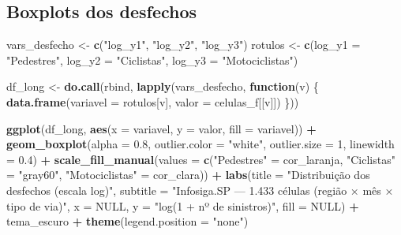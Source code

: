 \documentclass[
  11pt,
]{article}
\newenvironment{Shaded}{\begin{snugshade}}{\end{snugshade}}
\newcommand{\AttributeTok}[1]{\textcolor[rgb]{0.13,0.29,0.53}{#1}}
\newcommand{\ConstantTok}[1]{\textcolor[rgb]{0.56,0.35,0.01}{#1}}
\newcommand{\ControlFlowTok}[1]{\textcolor[rgb]{0.13,0.29,0.53}{\textbf{#1}}}
\newcommand{\DecValTok}[1]{\textcolor[rgb]{0.00,0.00,0.81}{#1}}
\newcommand{\FloatTok}[1]{\textcolor[rgb]{0.00,0.00,0.81}{#1}}
\newcommand{\FunctionTok}[1]{\textcolor[rgb]{0.13,0.29,0.53}{\textbf{#1}}}
\newcommand{\NormalTok}[1]{#1}
\newcommand{\OtherTok}[1]{\textcolor[rgb]{0.56,0.35,0.01}{#1}}
\newcommand{\SpecialCharTok}[1]{\textcolor[rgb]{0.81,0.36,0.00}{\textbf{#1}}}
\newcommand{\StringTok}[1]{\textcolor[rgb]{0.31,0.60,0.02}{#1}}
\begin{document}
\subsection{Boxplots dos desfechos}\label{boxplots-dos-desfechos}

\begin{Shaded}
\begin{Highlighting}[]
\NormalTok{vars\_desfecho }\OtherTok{\textless{}{-}} \FunctionTok{c}\NormalTok{(}\StringTok{"log\_y1"}\NormalTok{, }\StringTok{"log\_y2"}\NormalTok{, }\StringTok{"log\_y3"}\NormalTok{)}
\NormalTok{rotulos }\OtherTok{\textless{}{-}} \FunctionTok{c}\NormalTok{(}\AttributeTok{log\_y1 =} \StringTok{"Pedestres"}\NormalTok{, }\AttributeTok{log\_y2 =} \StringTok{"Ciclistas"}\NormalTok{, }\AttributeTok{log\_y3 =} \StringTok{"Motociclistas"}\NormalTok{)}

\NormalTok{df\_long }\OtherTok{\textless{}{-}} \FunctionTok{do.call}\NormalTok{(rbind, }\FunctionTok{lapply}\NormalTok{(vars\_desfecho, }\ControlFlowTok{function}\NormalTok{(v) \{}
  \FunctionTok{data.frame}\NormalTok{(}\AttributeTok{variavel =}\NormalTok{ rotulos[v], }\AttributeTok{valor =}\NormalTok{ celulas\_f[[v]])}
\NormalTok{\}))}

\FunctionTok{ggplot}\NormalTok{(df\_long, }\FunctionTok{aes}\NormalTok{(}\AttributeTok{x =}\NormalTok{ variavel, }\AttributeTok{y =}\NormalTok{ valor, }\AttributeTok{fill =}\NormalTok{ variavel)) }\SpecialCharTok{+}
  \FunctionTok{geom\_boxplot}\NormalTok{(}\AttributeTok{alpha =} \FloatTok{0.8}\NormalTok{, }\AttributeTok{outlier.color =} \StringTok{"white"}\NormalTok{,}
               \AttributeTok{outlier.size =} \DecValTok{1}\NormalTok{, }\AttributeTok{linewidth =} \FloatTok{0.4}\NormalTok{) }\SpecialCharTok{+}
  \FunctionTok{scale\_fill\_manual}\NormalTok{(}\AttributeTok{values =} \FunctionTok{c}\NormalTok{(}\StringTok{"Pedestres"} \OtherTok{=}\NormalTok{ cor\_laranja,}
                               \StringTok{"Ciclistas"} \OtherTok{=} \StringTok{"gray60"}\NormalTok{,}
                               \StringTok{"Motociclistas"} \OtherTok{=}\NormalTok{ cor\_clara)) }\SpecialCharTok{+}
  \FunctionTok{labs}\NormalTok{(}\AttributeTok{title =} \StringTok{"Distribuição dos desfechos (escala log)"}\NormalTok{,}
       \AttributeTok{subtitle =} \StringTok{"Infosiga.SP — 1.433 células (região × mês × tipo de via)"}\NormalTok{,}
       \AttributeTok{x =} \ConstantTok{NULL}\NormalTok{, }\AttributeTok{y =} \StringTok{"log(1 + nº de sinistros)"}\NormalTok{, }\AttributeTok{fill =} \ConstantTok{NULL}\NormalTok{) }\SpecialCharTok{+}
\NormalTok{  tema\_escuro }\SpecialCharTok{+} \FunctionTok{theme}\NormalTok{(}\AttributeTok{legend.position =} \StringTok{"none"}\NormalTok{)}
\end{Highlighting}
\end{Shaded}
\end{document}
